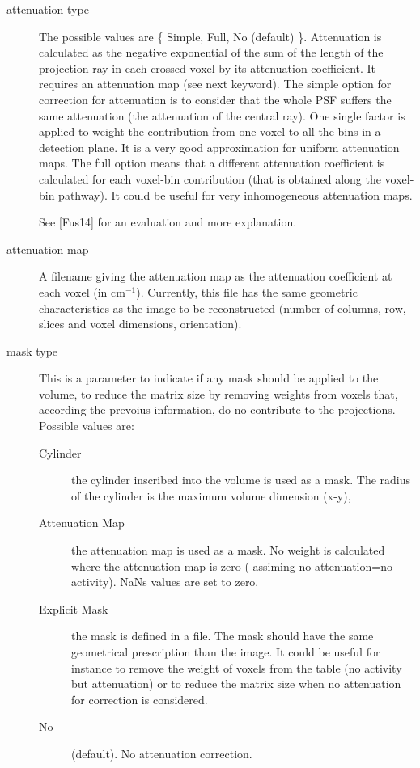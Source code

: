 \documentclass{article}
\begin{document}
\begin{description}
\item[attenuation type] 

  The possible values are \{ Simple, Full, No (default) \}. Attenuation is calculated as the negative
  exponential of the sum of the length of the projection ray in each crossed voxel by its attenuation
  coefficient. It requires an attenuation map (see next keyword). The simple option for correction for
  attenuation is to consider that the whole PSF suffers the same attenuation (the attenuation of the
  central ray). One single factor is applied to weight the contribution from one voxel to all the bins in
  a detection plane. It is a very good approximation for uniform attenuation maps. The full option means
  that a different attenuation coefficient is calculated for each voxel-bin contribution (that is obtained
  along the voxel-bin pathway). It could be useful for very inhomogeneous attenuation maps.

  See [Fus14] for an evaluation and more explanation.

\item[attenuation map]

  A filename giving the attenuation map as the attenuation coefficient at each voxel (in
  $\mathrm{cm}^{-1}$).  Currently, this file has the same geometric characteristics as the image to be
  reconstructed (number of columns, row, slices and voxel dimensions, orientation).

\item[mask type]

  This is a parameter to indicate if any mask should be applied to the volume, to reduce the matrix size
  by removing weights from voxels that, according the prevoius information, do no contribute to the
  projections. Possible values are:
 \begin{description}
 \item[Cylinder] the cylinder inscribed into the volume is used as a mask. The radius of the cylinder is
   the maximum volume dimension (x-y),
 \item[Attenuation Map] the attenuation map is used as a mask. No weight is calculated where the
   attenuation map is zero ( assiming no attenuation=no activity). NaNs values are set to zero.
 \item[Explicit Mask] the mask is defined in a file. The mask should have the same geometrical
   prescription than the image. It could be useful for instance to remove the weight of voxels from the
   table (no activity but attenuation) or to reduce the matrix size when no attenuation for correction is
   considered. 
  \item[No] (default). No attenuation correction.
 \end{description}


\end{description}
\end{document}
